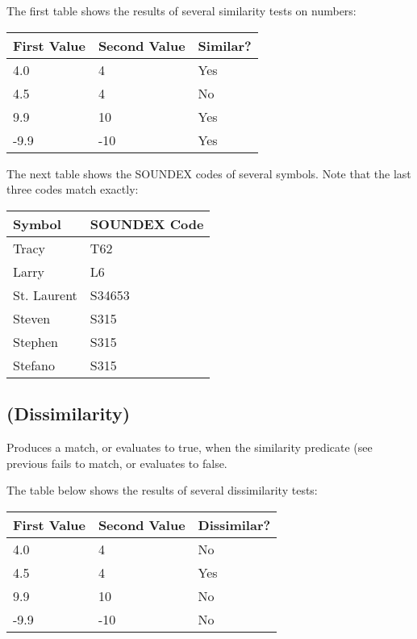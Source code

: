 \Example

The first table shows the results of several similarity tests on
numbers:

\begin{center}
\begin{tabular}{lll}
  \toprule
  First Value & Second Value & Similar? \\
  \midrule
  4.0        & 4            & Yes \\
  4.5        & 4            & No \\
  9.9      & 10           & Yes \\
  -9.9     &   -10          & Yes \\
  \bottomrule
\end{tabular}
\end{center}

The next table shows the SOUNDEX codes of several symbols.  Note that
the last three codes match exactly:

\begin{center}
\begin{tabular}{ll}
  \toprule
  Symbol      & SOUNDEX Code \\
  \midrule
  Tracy       & T62          \\
  Larry       & L6           \\
  St. Laurent & S34653       \\
  Steven      & S315         \\
  Stephen     & S315         \\
  Stefano     & S315         \\
  \bottomrule
\end{tabular}
\end{center}

\subsection{\co{-\~{}=} (Dissimilarity)}

Produces a match, or evaluates to true, when the similarity predicate
(see previous fails to match, or evaluates to false.

\Example

The table below shows the results of several dissimilarity tests:

\begin{center}
\begin{tabular}{lll}
  \toprule
  First Value & Second Value & Dissimilar? \\
  \midrule
  4.0         & 4            & No          \\
  4.5         & 4            & Yes         \\
  9.9         & 10           & No          \\
  -9.9        & -10          & No          \\
  \bottomrule
\end{tabular}
\end{center}

